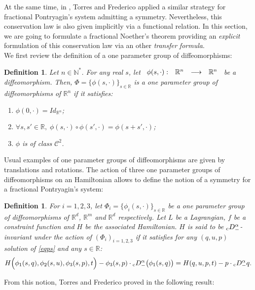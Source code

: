 \documentclass[english,11pt,reqno]{smfart}
\newtheorem{definition}[theorem]{Definition}
\newcommand{\N}{\mathbb{N}}
\newcommand{\R}{\mathbb{R}}
\newcommand{\CC}{\mathscr{C}}
\newcommand{\cDM}{{}_{{\rm c}} D^\alpha_-}
\newcommand{\fonctionsansdef}[3]{\begin{array}[t]{lrcl}#1 :&#2 &\longrightarrow &#3 \end{array}}
\begin{document}
At the same time, in \cite{torr,torr2}, Torres and Frederico applied a similar strategy for fractional Pontryagin's system admitting a symmetry. Nevertheless, this conservation law is also given implicitly via a functional relation. In this section, we are going to formulate a fractional Noether's theorem providing an \textit{explicit} formulation of this conservation law via an other \textit{transfer formula}. \\

We first review the definition of a one parameter group of diffeomorphisms: 
\begin{definition}
Let $n \in \N^*$. For any real $s$, let $\fonctionsansdef{\phi (s,\cdot)}{\R ^n}{\R ^n}$ be a diffeomorphism. Then, $\Phi = \{ \phi (s,\cdot) \}_{s \in \R}$ is a one parameter group of diffeomorphisms of $\R^n$ if it satisfies:
\begin{enumerate}
\item $\phi (0,\cdot) = Id_{\R ^n}$; 
\item $\forall s,s' \in \R, \; \phi (s,\cdot) \circ \phi (s',\cdot) = \phi (s+s',\cdot) $;
\item $\phi$ is of class $\CC^2$.
\end{enumerate}
\end{definition}

Usual examples of one parameter groups of diffeomorphisms are given by translations and rotations. The action of three one parameter groups of diffeomorphisms on an Hamiltonian allows to define the notion of a symmetry for a fractional Pontryagin's system:

\begin{definition}\label{defsym}
For $i=1,2,3$, let $\Phi_i = \{ \phi_i (s,\cdot) \}_{s \in \R}$ be a one parameter group of diffeomorphisms of $\R^d$, $ \R^m$ and $\R^d$ respectively. Let $L$ be a Lagrangian, $f$ be a constraint function and $H$ be the associated Hamiltonian. $H$ is said to be $\cDM$-invariant under the action of $(\Phi_i)_{i=1,2,3}$ if it satisfies for any $(q,u,p)$ solution of \eqref{eqps} and any $s \in \R$:
\begin{equation}
H \Big( \phi_1 (s,q), \phi_2 (s,u) , \phi_3 (s,p) ,t \Big) - \phi_3 (s,p) \cdot \cDM \big( \phi_1 (s,q) \big) = H(q,u,p,t) - p \cdot \cDM q.
\end{equation}
\end{definition}

From this notion, Torres and Frederico proved in \cite{torr,torr2} the following result:
\end{document}
